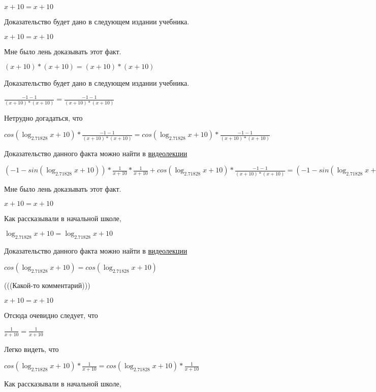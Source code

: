 \documentclass[12pt,a4paper,fleqn]{article}
\theoremstyle{definition}
\begin{document}
$ x  +  10  =  x  +  10 $

Доказательство будет дано в следующем издании учебника.

$ x  +  10  =  x  +  10 $

Мне было лень доказывать этот факт.

$( x  +  10 ) * ( x  +  10 ) = ( x  +  10 ) * ( x  +  10 )$

Доказательство будет дано в следующем издании учебника.

$\frac{ -1  -  1 }{( x  +  10 ) * ( x  +  10 )}
 = \frac{ -1  -  1 }{( x  +  10 ) * ( x  +  10 )}
$

Нетрудно догадаться, что

$cos(\log_{ 2.71828 }{ x  +  10 }) * \frac{ -1  -  1 }{( x  +  10 ) * ( x  +  10 )}
 = cos(\log_{ 2.71828 }{ x  +  10 }) * \frac{ -1  -  1 }{( x  +  10 ) * ( x  +  10 )}
$

Доказательство данного факта можно найти в \href{https://www.youtube.com/watch?v=dQw4w9WgXcQ}{видеолекции}

$( -1  - sin(\log_{ 2.71828 }{ x  +  10 })) * \frac{ 1 }{ x  +  10 }
 * \frac{ 1 }{ x  +  10 }
 + cos(\log_{ 2.71828 }{ x  +  10 }) * \frac{ -1  -  1 }{( x  +  10 ) * ( x  +  10 )}
 = ( -1  - sin(\log_{ 2.71828 }{ x  +  10 })) * \frac{ 1 }{ x  +  10 }
 * \frac{ 1 }{ x  +  10 }
 + cos(\log_{ 2.71828 }{ x  +  10 }) * \frac{ -1  -  1 }{( x  +  10 ) * ( x  +  10 )}
$

Мне было лень доказывать этот факт.

$ x  +  10  =  x  +  10 $

Как рассказывали в начальной школе,

$\log_{ 2.71828 }{ x  +  10 } = \log_{ 2.71828 }{ x  +  10 }$

Доказательство данного факта можно найти в \href{https://www.youtube.com/watch?v=dQw4w9WgXcQ}{видеолекции}

$cos(\log_{ 2.71828 }{ x  +  10 }) = cos(\log_{ 2.71828 }{ x  +  10 })$

(((Какой-то комментарий)))

$ x  +  10  =  x  +  10 $

Отсюда очевидно следует, что

$\frac{ 1 }{ x  +  10 }
 = \frac{ 1 }{ x  +  10 }
$

Легко видеть, что

$cos(\log_{ 2.71828 }{ x  +  10 }) * \frac{ 1 }{ x  +  10 }
 = cos(\log_{ 2.71828 }{ x  +  10 }) * \frac{ 1 }{ x  +  10 }
$

Как рассказывали в начальной школе,
\end{document}
